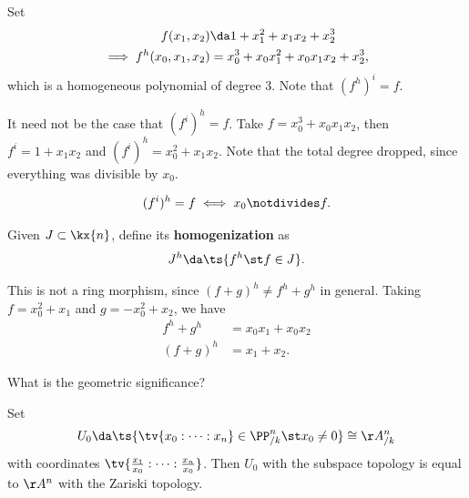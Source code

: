 \begin{example}[?]

Set
\begin{align*}  
f(x_1, x_2) &\da  1 + x_1^2 + x_1 x_2 + x_2^3 \\
\implies f^h(x_0, x_1, x_2) &= x_0^3 + x_0 x_1^2 + x_0 x_1 x_2 + x_2^3
,\end{align*} which is a homogeneous polynomial of degree \(3\). Note
that \((f^h)^i = f\).

\end{example}

\begin{example}[?]

It need not be the case that \((f^i)^h = f\). Take
\(f = x_0^3 + x_0 x_1 x_2\), then \(f^i = 1 + x_1 x_2\) and
\((f^i)^h = x_0^2 + x_1 x_2\). Note that the total degree dropped, since
everything was divisible by \(x_0\).

\end{example}

\begin{remark}

\begin{align*}  
(f^i)^h = f \iff x_0 \notdivides f
.\end{align*}

\end{remark}

\begin{definition}

Given \(J\subset \kx{n}\), define its \textbf{homogenization} as
\begin{align*}  
J^h \da \ts{f^h \st f\in J}
.\end{align*}

\end{definition}

\begin{example}

This is not a ring morphism, since \((f+g)^h \neq f^h + g^h\) in
general. Taking \(f = x_0^2 + x_1\) and \(g= -x_0^2 + x_2\), we have
\begin{align*}  
f^h + g^h &= x_0 x_1 + x_0 x_2 \\ 
(f+g)^h &= x_1 + x_2
.\end{align*}

\end{example}

What is the geometric significance?

\begin{proposition}

Set
\begin{align*}
U_0 \da \ts{\tv{x_0: \cdots :x_n} \in \PP^n_{/k} \st x_0 \neq 0 } \cong \AA^n_{/k}
\end{align*} with coordinates
\(\tv{{x_1\over x_0} : \cdots : {x_n \over x_0}}\). Then \(U_0\) with
the subspace topology is equal to \(\AA^n\) with the Zariski topology.

\end{proposition}

